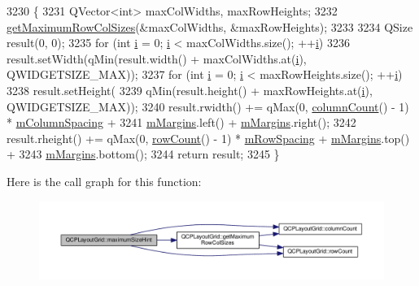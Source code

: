 \begin{DoxyCode}
3230                                            \{
3231   QVector<int> maxColWidths, maxRowHeights;
3232   \hyperlink{class_q_c_p_layout_grid_af348d903e3b8bc416f1fe1b8125d1173}{getMaximumRowColSizes}(&maxColWidths, &maxRowHeights);
3233 
3234   QSize result(0, 0);
3235   \textcolor{keywordflow}{for} (\textcolor{keywordtype}{int} \hyperlink{_comparision_pictures_2_createtest_image_8m_a6f6ccfcf58b31cb6412107d9d5281426}{i} = 0; \hyperlink{_comparision_pictures_2_createtest_image_8m_a6f6ccfcf58b31cb6412107d9d5281426}{i} < maxColWidths.size(); ++\hyperlink{_comparision_pictures_2_createtest_image_8m_a6f6ccfcf58b31cb6412107d9d5281426}{i})
3236     result.setWidth(qMin(result.width() + maxColWidths.at(\hyperlink{_comparision_pictures_2_createtest_image_8m_a6f6ccfcf58b31cb6412107d9d5281426}{i}), QWIDGETSIZE\_MAX));
3237   \textcolor{keywordflow}{for} (\textcolor{keywordtype}{int} \hyperlink{_comparision_pictures_2_createtest_image_8m_a6f6ccfcf58b31cb6412107d9d5281426}{i} = 0; \hyperlink{_comparision_pictures_2_createtest_image_8m_a6f6ccfcf58b31cb6412107d9d5281426}{i} < maxRowHeights.size(); ++\hyperlink{_comparision_pictures_2_createtest_image_8m_a6f6ccfcf58b31cb6412107d9d5281426}{i})
3238     result.setHeight(
3239         qMin(result.height() + maxRowHeights.at(\hyperlink{_comparision_pictures_2_createtest_image_8m_a6f6ccfcf58b31cb6412107d9d5281426}{i}), QWIDGETSIZE\_MAX));
3240   result.rwidth() += qMax(0, \hyperlink{class_q_c_p_layout_grid_ac39074eafd148b82d0762090f258189e}{columnCount}() - 1) * \hyperlink{class_q_c_p_layout_grid_ae9ac48f0791be07ead0a96dbd5622770}{mColumnSpacing} +
3241                      \hyperlink{class_q_c_p_layout_element_ac2a32b99ee527ca5dfff9da03628fe94}{mMargins}.left() + \hyperlink{class_q_c_p_layout_element_ac2a32b99ee527ca5dfff9da03628fe94}{mMargins}.right();
3242   result.rheight() += qMax(0, \hyperlink{class_q_c_p_layout_grid_af8e6c7a05864ebe610c87756c7b9079c}{rowCount}() - 1) * \hyperlink{class_q_c_p_layout_grid_a8b67f183f4645739cc4c794d75843b40}{mRowSpacing} + 
      \hyperlink{class_q_c_p_layout_element_ac2a32b99ee527ca5dfff9da03628fe94}{mMargins}.top() +
3243                       \hyperlink{class_q_c_p_layout_element_ac2a32b99ee527ca5dfff9da03628fe94}{mMargins}.bottom();
3244   \textcolor{keywordflow}{return} result;
3245 \}
\end{DoxyCode}


Here is the call graph for this function\+:\nopagebreak
\begin{figure}[H]
\begin{center}
\leavevmode
\includegraphics[width=350pt]{class_q_c_p_layout_grid_a1ec4bf5914900a51829a7919f74aa58c_cgraph}
\end{center}
\end{figure}


